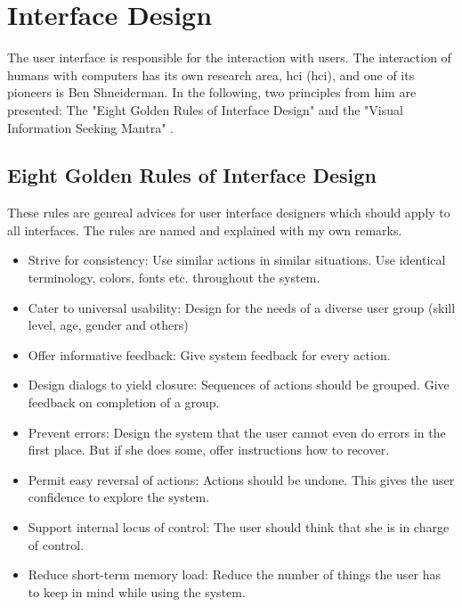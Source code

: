 \documentclass[11pt]{report}
\begin{document}
\section{Interface Design}
\label{id}

The user interface is responsible for the interaction with users. The interaction of humans with computers has its own research area, \acrlong{hci} (\acrshort{hci}), and one of its pioneers is Ben Shneiderman. In the following, two principles from him are presented: The "Eight Golden Rules of Interface Design" \cite{Shneiderman2010} and the "Visual Information Seeking Mantra" \cite{Shneiderman1996}.

\subsection{Eight Golden Rules of Interface Design}
\label{Golden}

These rules \cite{Shneiderman2010} are genreal advices for user interface designers which should apply to all interfaces. The rules are named and explained with my own remarks. \\

\begin{itemize}
	\item Strive for consistency: Use similar actions in similar situations. Use identical terminology, colors, fonts etc. throughout the system.	
	\item Cater to universal usability: Design for the needs of a diverse user group (skill level, age, gender and others)
	\item Offer informative feedback: Give system feedback for every action.
	\item Design dialogs to yield closure: Sequences of actions should be grouped. Give feedback on completion of a group.
	\item Prevent errors: Design the system that the user cannot even do errors in the first place. But if she does some, offer instructions how to recover.
	\item Permit easy reversal of actions: Actions should be undone. This gives the user confidence to explore the system.
	\item Support internal locus of control: The user should think that she is in charge of control.
	\item Reduce short-term memory load: Reduce the number of things the user has to keep in mind while using the system.
\end{itemize}
\end{document}
